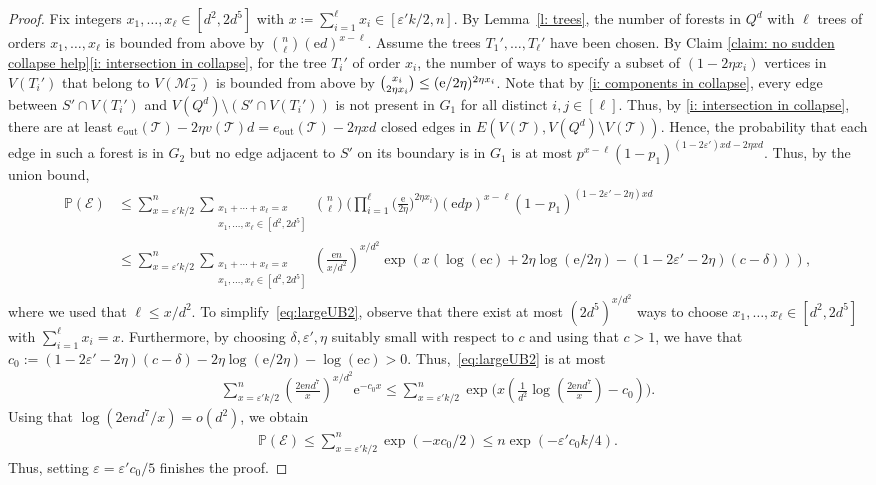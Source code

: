 \documentclass[reqno,final,a4paper]{amsart}
\theoremstyle{definition}
\newcommand{\cE}{\mathcal{E}}
\newcommand{\cM}{\mathcal{M}}
\newcommand{\cT}{\mathcal{T}}
\def\e{\mathrm{e}}
\def\eps{\varepsilon}
\newcommand{\1}{\mathbbm{1}}
\begin{document}
\begin{proof}
Fix integers $x_1,\ldots, x_{\ell}\in [d^2,2d^5]$ with $x\coloneqq \sum_{i=1}^{\ell} x_i\in [\eps' k/2, n]$. By Lemma~\ref{l: trees}, the number of forests in $Q^d$ with $\ell$ trees of orders $x_1,\ldots, x_{\ell}$ is bounded from above by $\binom{n}{\ell}(\e d)^{x-\ell}$.
Assume the trees $T_1',\ldots, T_{\ell}'$ have been chosen.
By Claim \ref{claim: no sudden collapse help}\ref{i: intersection in collapse}, for the tree $T_i'$ of order $x_i$, the number of ways to specify a subset of $(1-2\eta x_i)$ vertices in $V(T_i')$ that belong to $V(\cM_2^-)$ is bounded from above by $\tbinom{x_i}{2\eta x_i}\le (\e/2\eta)^{2\eta x_i}$.
Note that by \ref{i: components in collapse}, every edge between $S'\cap V(T_i')$ and $V(Q^d)\setminus (S'\cap V(T_i'))$ is not present in $G_1$ for all distinct $i,j\in [\ell]$. Thus, by \ref{i: intersection in collapse}, there are at least $e_{\mathrm{out}}(\cT)-2\eta v(\cT)d=e_{\mathrm{out}}(\cT)-2\eta xd$ closed edges in $E(V(\cT),V(Q^d)\setminus V(\cT))$.
Hence, the probability that each edge in such a forest is in $G_2$ but no edge adjacent to $S'$ on its boundary is in $G_1$ is at most $p^{x-\ell}(1-p_1)^{(1-2\eps')xd-2\eta xd}$. 
Thus, by the union bound,
\begin{align}
    \mathbb{P}\left(\cE\right)&\le \sum_{x=\eps' k/2}^{n} \sum_{\substack{x_1+\cdots+x_{\ell}=x\\x_1,\ldots,x_{\ell}\in[d^{2},2d^{5}]}}\binom{n}{\ell} \bigg(\prod_{i=1}^{\ell} \bigg(\frac{\e}{2\eta}\bigg)^{2\eta x_i}\bigg) (\e dp)^{x-\ell}(1-p_1)^{(1-2\eps'-2\eta)xd}\nonumber\\
    &\le \sum_{x=\eps' k/2}^{n}\sum_{\substack{x_1+\cdots+x_{\ell}=x\\x_1,\ldots,x_{\ell}\in[d^{2},2d^{5}]}}\left(\frac{\e n}{x/d^2}\right)^{x/d^2}\exp(x\left(\log(\e c)+2\eta\log(\e/2\eta)-(1-2\eps'-2\eta)(c-\delta)\right)),\label{eq:largeUB2}
\end{align}
where we used that $\ell\le x/d^2$. 
To simplify~\eqref{eq:largeUB2}, observe that there exist at most $(2d^5)^{x/d^2}$ ways to choose $x_1,\ldots, x_{\ell}\in[d^2,2d^5]$ with $\sum_{i=1}^{\ell}x_i=x$.
Furthermore, by choosing $\delta,\eps',\eta$ suitably small with respect to $c$ and using that $c>1$, we have that $c_0 := (1-2\eps'-2\eta)(c-\delta) - 2\eta\log(\e/2\eta) - \log(\e c) > 0$.
Thus,~\eqref{eq:largeUB2} is at most
\begin{align*}
\sum_{x=\eps' k/2}^{n}\left(\frac{2\e nd^7}{x}\right)^{x/d^2}\e^{-c_0x}\le \sum_{x=\eps' k/2}^{n}\exp\bigg(x\left(\frac{1}{d^2}\log\left(\frac{2\e nd^7}{x}\right)-c_0\right)\bigg).
\end{align*}
Using that $\log(2\e nd^7/x)=o(d^2)$, we obtain
\begin{align*}
\mathbb P(\cE)\le \sum_{x=\eps' k/2}^n\exp(-xc_0/2)\le n \exp(-\eps'c_0k/4).
\end{align*}
Thus, setting $\eps = \eps' c_0/5$ finishes the proof.
\end{proof}
\end{document}

